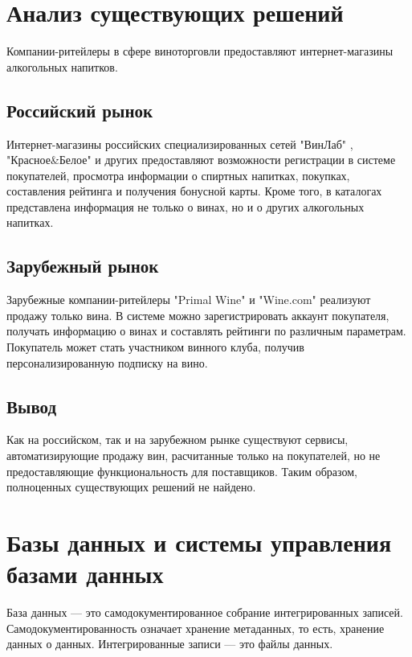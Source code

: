 \section{Анализ существующих решений}

Компании-ритейлеры в сфере виноторговли предоставляют интернет-магазины алкогольных напитков.

\subsection{Российский рынок}

Интернет-магазины российских специализированных сетей "ВинЛаб" \cite{winelab}, "Красное\&Белое" \cite{kb} и других предоставляют возможности 
регистрации в системе покупателей, просмотра информации о спиртных напитках, покупках, составления рейтинга и получения бонусной карты. Кроме того, в каталогах представлена информация не только о винах, но и о других алкогольных напитках.

\subsection{Зарубежный рынок}

Зарубежные компании-ритейлеры "Primal Wine" \cite{primal_wine} и "Wine.com" \cite{wine_com} реализуют продажу только вина. В системе можно зарегистрировать аккаунт покупателя, получать информацию о винах и составлять рейтинги по различным параметрам. Покупатель может стать участником винного клуба, получив персонализированную подписку на вино. 

\subsection{Вывод}

Как на российском, так и на зарубежном рынке существуют сервисы, автоматизирующие продажу вин, расчитанные только на покупателей, но не предоставляющие функциональность для поставщиков. Таким образом, полноценных существующих решений не найдено.

\section{Базы данных и системы управления базами данных}

База данных --- это самодокументированное собрание интегрированных записей. Самодокументированность означает хранение метаданных, то есть, хранение данных о данных. Интегрированные записи --- это файлы данных.

